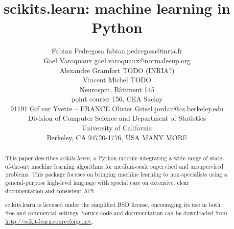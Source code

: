\documentclass[twoside,11pt]{article}
\begin{document}
\title{scikits.learn: machine learning in Python}


\author{\name Fabian Pedregosa \email fabian.pedregosa@inria.fr \\
        \name Gael Varoquaux \email gael.varoquaux@normalesup.org  \\
        \name Alexandre Gramfort \email TODO (INRIA?)\\
        \name Vincent Michel  \email TODO \\
       \addr  Neurospin, B\^atiment 145\\
       point courier 156, CEA Saclay\\
       91191 Gif sur Yvette – FRANCE
       \AND
       \name Olivier Grisel \email jordan@cs.berkeley.edu \\
       \addr Division of Computer Science and Department of Statistics\\
       University of California\\
       Berkeley, CA 94720-1776, USA
       \AND
       \name MANY MORE
}



\maketitle

\begin{abstract}
This paper describes \emph{scikits.learn}, a Python module integrating
a wide range of state-of-the-art machine learning algorithms for
medium-scale supervised and unsupervised problems. This package
focuses on bringing machine learning to non-specialists using a
general-purpose high-level language with special care on extensive,
clear documentation and consistent API.



scikits.learn is licensed under the simplified BSD license,
encouraging its use in both free and commercial settings. Soruce code
and documentation can be downloaded from
\url{http://scikit-learn.sourceforge.net}.

\end{abstract}



\end{document}
